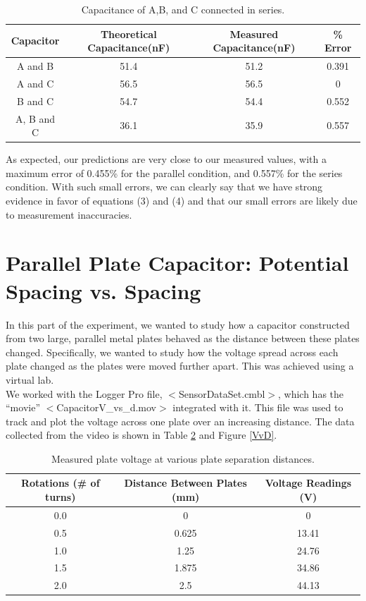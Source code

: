 \documentclass[oneside,12pt]{amsart}
\begin{document}
\begin{table}[H]
	\begin{tabular}{ |c|c|c|c|}
		\hline
		Capacitor & Theoretical Capacitance(nF)& Measured Capacitance(nF) &\% Error\\
		\hline
		A and B&51.4&51.2&0.391\\
		A and C&56.5&56.5&0\\
		B and C&54.7&54.4&0.552\\
		A, B and C&36.1&35.9&0.557\\
		\hline
	\end{tabular}
	\caption{Capacitance of A,B, and C connected in series.}
	\label{inSeries}
\end{table}
	
	As expected, our predictions are very close to our measured values, with a maximum error of 0.455\% for the parallel condition, and 0.557\% for the series condition. With such small errors, we can clearly say that we have strong evidence in favor of equations (3) and (4) and that our small errors are likely due to measurement inaccuracies. 

	
\section{Parallel Plate Capacitor: Potential Spacing vs. Spacing}
	In this part of the experiment, we wanted to study how a capacitor constructed from two large, parallel metal plates behaved as the distance between these plates changed. Specifically, we wanted to study how the voltage spread across each plate changed as the plates were moved further apart. This was achieved using a virtual lab.\\
	
	\indent We worked with the Logger Pro file, $<$SensorDataSet.cmbl$>$, which has the “movie” $<$CapacitorV\_vs\_d.mov$>$ integrated with it. This file was used to track and plot the voltage across one plate over an increasing distance. The data collected from the video is shown in Table \ref{Volt} and Figure \ref{VvD}.\\
	
	\begin{table}[h]
		\begin{tabular}{|c|c|c|}
			\hline
			Rotations (\# of turns) & Distance Between Plates (mm) & Voltage Readings (V)\\
			\hline
			0.0&0&0\\
			0.5&0.625&13.41\\
			1.0 &1.25&24.76\\
			1.5 &1.875&34.86\\
			2.0&2.5&44.13\\
			\hline
		\end{tabular}
		\caption{Measured plate voltage at various plate separation distances.} 
		\label{Volt}
	\end{table}
\end{document}
